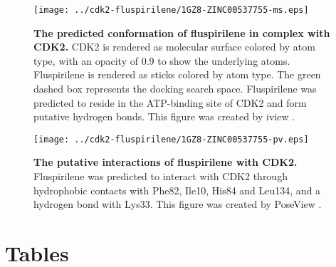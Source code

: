 \documentclass[10pt]{article}
\begin{document}
\begin{figure}
\begin{center}
\texttt{[image: ../cdk2-fluspirilene/1GZ8-ZINC00537755-ms.eps]}
\end{center}
\caption{
{\bf The predicted conformation of fluspirilene in complex with CDK2.} CDK2 is rendered as molecular surface colored by atom type, with an opacity of 0.9 to show the underlying atoms. Fluspirilene is rendered as sticks colored by atom type. The green dashed box represents the docking search space. Fluspirilene was predicted to reside in the ATP-binding site of CDK2 and form putative hydrogen bonds. This figure was created by iview \cite{1366}.
}
\label{1GZ8-ZINC00537755-ms}
\end{figure}

\begin{figure}
\begin{center}
\texttt{[image: ../cdk2-fluspirilene/1GZ8-ZINC00537755-pv.eps]}
\end{center}
\caption{
{\bf The putative interactions of fluspirilene with CDK2.} Fluspirilene was predicted to interact with CDK2 through hydrophobic contacts with Phe82, Ile10, His84 and Leu134, and a hydrogen bond with Lys33. This figure was created by PoseView \cite{748}.
}
\label{1GZ8-ZINC00537755-pv}
\end{figure}

\section*{Tables}
\end{document}
